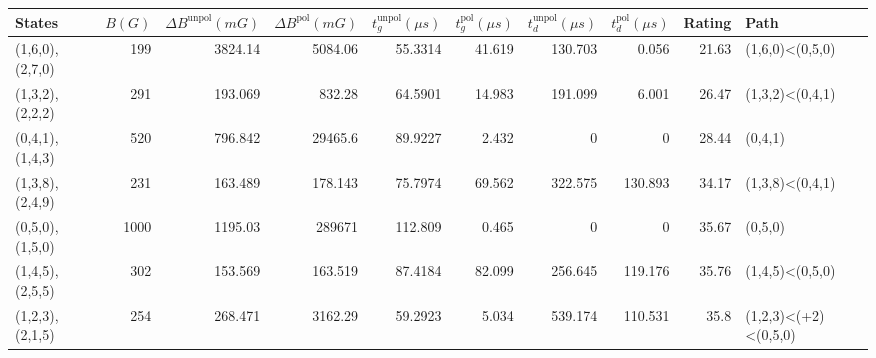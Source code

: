 \begin{tabular}{lrrrrrrrrl}
\hline
 {States}        &   {$B(G)$} &   {$\Delta B^{\text{unpol}}(mG)$} &   {$\Delta B^{\text{pol}}(mG)$} &   {$t^{\text{unpol}}_{g}(\mu s)$} &   {$t^{\text{pol}}_{g}(\mu s)$} &   {$t^{\text{unpol}}_{d}(\mu s)$} &   {$t^{\text{pol}}_{d}(\mu s)$} &   {Rating} & {Path}               \\
\hline
 (1,6,0),(2,7,0) &        199 &                          3824.14  &                  5084.06        &                           55.3314 &                          41.619 &                           130.703 &                           0.056 &      21.63 & (1,6,0)<(0,5,0)      \\
 (1,3,2),(2,2,2) &        291 &                           193.069 &                   832.28        &                           64.5901 &                          14.983 &                           191.099 &                           6.001 &      26.47 & (1,3,2)<(0,4,1)      \\
 (0,4,1),(1,4,3) &        520 &                           796.842 &                 29465.6         &                           89.9227 &                           2.432 &                             0     &                           0     &      28.44 & (0,4,1)              \\
 (1,3,8),(2,4,9) &        231 &                           163.489 &                   178.143       &                           75.7974 &                          69.562 &                           322.575 &                         130.893 &      34.17 & (1,3,8)<(0,4,1)      \\
 (0,5,0),(1,5,0) &       1000 &                          1195.03  &                289671           &                          112.809  &                           0.465 &                             0     &                           0     &      35.67 & (0,5,0)              \\
 (1,4,5),(2,5,5) &        302 &                           153.569 &                   163.519       &                           87.4184 &                          82.099 &                           256.645 &                         119.176 &      35.76 & (1,4,5)<(0,5,0)      \\
 (1,2,3),(2,1,5) &        254 &                           268.471 &                  3162.29        &                           59.2923 &                           5.034 &                           539.174 &                         110.531 &      35.8  & (1,2,3)<(+2)<(0,5,0) \\

\end{tabular}
